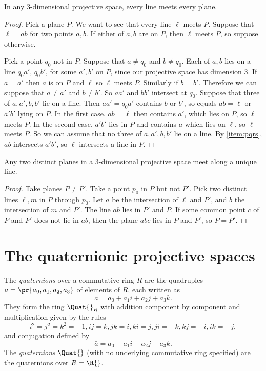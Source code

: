 \begin{lemma}
In any 3-dimensional projective space, every line meets every plane.
\end{lemma}
\begin{proof}
Pick a plane \(P\).
We want to see that every line \(\ell\) meets \(P\).
Suppose that \(\ell=ab\) for two points \(a, b\).
If either of \(a, b\) are on \(P\), then \(\ell\) meets \(P\), so suppose otherwise.

Pick a point \(q_0\) not in \(P\).
Suppose that \(a \ne q_0\) and \(b \ne q_0\).
Each of \(a, b\) lies on a line \(q_0 a'\), \(q_0 b'\), for some \(a', b'\) on \(P\), since our projective space has dimension 3.
If \(a=a'\) then \(a\) is on \(P\) and \(\ell\) so \(\ell\) meets \(P\).
Similarly if \(b=b'\).
Therefore we can suppose that \(a \ne a'\) and \(b \ne b'\).
So \(aa'\) and \(bb'\) intersect at \(q_0\).
Suppose that three of \(a, a', b, b'\) lie on a line. 
Then \(aa'=q_0 a'\) contains \(b\) or \(b'\), so equals \(ab=\ell\) or \(a'b'\) lying on \(P\).
In the first case, \(ab=\ell\) then contains \(a'\), which lies on \(P\), so \(\ell\) meets \(P\).
In the second case, \(a'b'\) lies in \(P\) and contains \(a\) which lies on \(\ell\), so \(\ell\) meets \(P\).
So we can assume that no three of \(a, a', b, b'\) lie on a line. 
By \ref{item:pqrs}, \(ab\) intersects \(a'b'\), so \(\ell\) intersects a line in \(P\).
\end{proof}

\begin{lemma}
Any two distinct planes in a 3-dimensional projective space meet along a unique line.
\end{lemma}
\begin{proof}
Take planes \(P \ne P'\).
Take a point \(p_0\) in \(P\) but not \(P'\).
Pick two distinct lines \(\ell, m\) in \(P\) through \(p_0\).
Let \(a\) be the intersection of \(\ell\) and \(P'\), and \(b\) the intersection of \(m\) and \(P'\).
The line \(ab\) lies in \(P'\) and \(P\).
If some common point \(c\) of \(P\) and \(P'\) does not lie in \(ab\), then the plane \(abc\) lies in \(P\) and \(P'\), so \(P=P'\).
\end{proof}



\section{The quaternionic projective spaces}
The \emph{quaternions} over a commutative ring \(R\) are the quadruples \(a=\pr{a_0,a_1,a_2,a_3}\) of elements of \(R\), each written as
\[
a=a_0  + a_1 i + a_2 j + a_3 k.
\]
They form the ring \(\Quat{}_R\) with addition component by component and multiplication given by the rules
\[
i^2=j^2=k^2=-1, ij=k, jk=i, ki=j, ji=-k, kj=-i, ik=-j,
\]
and conjugation defined by 
\[
\bar{a} = a_0 - a_1 i - a_2 j - a_3 k.
\]
The \emph{quaternions} \(\Quat{}\) (with no underlying commutative ring specified) are the quaternions over \(R=\R{}\).

